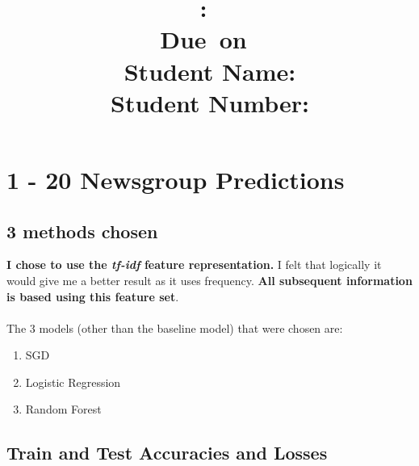 \documentclass[10pt]{article}
\title{
    \vspace{2in}
    \textmd{\textbf{\hmwkClass:\ \hmwkTitle}}\\
    \vspace{0.1in}\small{Due\ on\ \hmwkDueDate}\\
    \vspace{3in}
    \vspace{0.1in}\large{Student Name: \textbf{\hmwkAuthorName} } \\
    \vspace{0.1in}\large{Student Number: \textbf{\hmwkAuthorNumber} } \\
}
\date{}
\begin{document}
\maketitle
\pagebreak

\begin{center} \tableofcontents \end{center}
\pagebreak

\clearpage
\setcounter{page}{1}

\section{1 - 20 Newsgroup Predictions}

\subsection{3 methods chosen}

\textbf{I chose to use the \textit{tf-idf} feature representation.} I felt that logically it would give me a better result as it uses frequency. \textbf{All subsequent information is based using this feature set}.
\\ \\
The 3 models (other than the baseline model) that were chosen are: 
\begin{enumerate}
\item SGD
\item Logistic Regression
\item Random Forest
\end{enumerate}

\subsection{Train and Test Accuracies and Losses}
\end{document}
